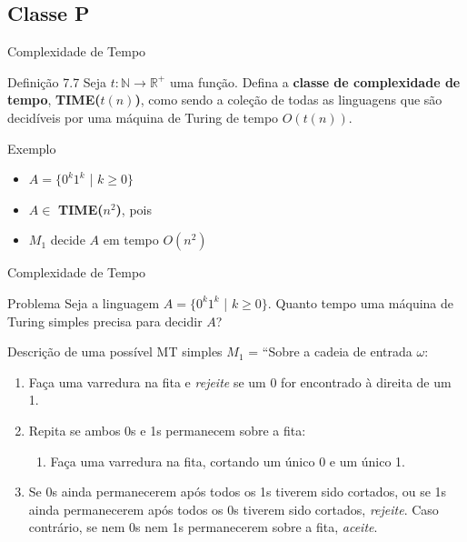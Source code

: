 \documentclass[xcolor=dvipsnames,table]{beamer}
\begin{document}
	\subsection{Classe P}
	\begin{frame}{Complexidade de Tempo}
		\begin{block}{Definição 7.7}
			Seja $t: \mathbb{N} \rightarrow \mathbb{R}^+$ uma função. Defina a {\bf classe de complexidade de tempo}, {\bf TIME($t(n)$)}, como sendo a coleção de todas as linguagens que são decidíveis por uma máquina de Turing de tempo $O(t(n))$.
		\end{block} 
		\begin{block}{Exemplo}
			\begin{itemize}
				\item $A = \{ 0^k 1^k$ | $k \geq 0 \}$
				\item $A \in$ {\bf TIME($n^2$)}, pois
				\item $M_1$ decide $A$ em tempo $O(n^2)$
			\end{itemize}
		\end{block}
	\end{frame}
	
	\begin{frame}[shrink]{Complexidade de Tempo}
		\begin{block}{Problema}
			Seja a linguagem $A = \{ 0^k 1^k$ | $k \geq 0 \}$. Quanto tempo uma máquina de Turing simples precisa para decidir $A$?
		\end{block} 
		\begin{block}{Descrição de uma possível MT simples}
			$M_1$ = ``Sobre a cadeia de entrada $\omega$:
			\begin{enumerate}
				\item Faça uma varredura na fita e {\it rejeite} se um 0 for encontrado à direita de um 1.
				\item Repita se ambos 0s e 1s permanecem sobre a fita:
				\begin{enumerate}
					\item Faça uma varredura na fita, cortando um único 0 e um único 1.
				\end{enumerate}
				\item Se 0s ainda permanecerem após todos os 1s tiverem sido cortados, ou se 1s ainda permanecerem após todos os 0s tiverem sido cortados, {\it rejeite}. Caso contrário, se nem 0s nem 1s permanecerem sobre a fita, {\it aceite}.
			\end{enumerate}
		\end{block}
	\end{frame}
	
\end{document}
